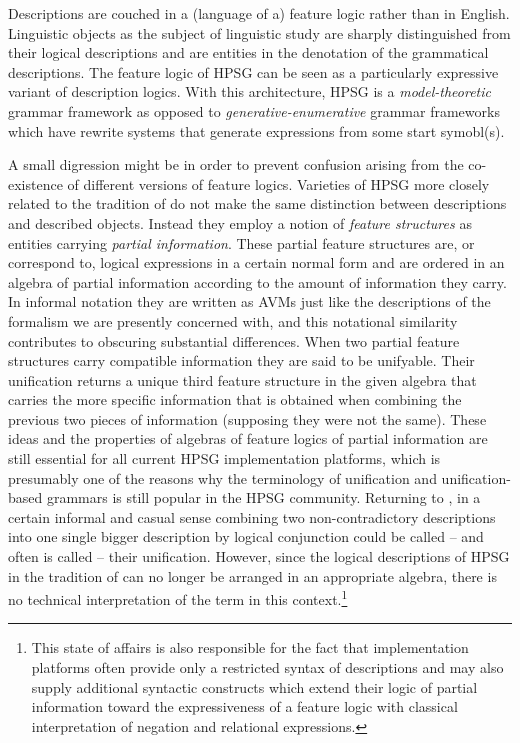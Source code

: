 \documentclass[output=paper
                ,modfonts
                ,nonflat
	        ,collection
	        ,collectionchapter
	        ,collectiontoclongg
 	        ,biblatex
                ,babelshorthands
                ,newtxmath
                ,draftmode
                ,colorlinks, citecolor=brown
]{./langsci/langscibook}
\begin{document}
{Descriptions are couched in a (language of a) feature logic rather
than in English. Linguistic objects as the subject of linguistic study
are sharply distinguished from their logical descriptions and are
entities in the denotation of the grammatical descriptions.  The
feature logic of HPSG can be seen as a particularly expressive variant
of description logics. With this architecture, HPSG is a
\emph{model-theoretic} grammar framework as opposed to
\emph{generative-enumerative} grammar frameworks which
have rewrite systems that generate expressions
from some start symobl(s).

A small digression might be in order to prevent confusion arising from
the co-existence of different versions of feature logics.  Varieties
of HPSG more closely related to the tradition of \cite{PollardSag1987}
do not make the same distinction between descriptions and described
objects. Instead they employ a notion of \emph{feature structures} as
entities carrying \emph{partial information}. These partial feature
structures are, or correspond to, logical expressions in a certain
normal form and are ordered in an algebra of partial information
according to the amount of information they carry. In informal
notation they are written as AVMs just like the descriptions of the
formalism we are presently concerned with, and this notational
similarity contributes to obscuring substantial differences.  When two
partial feature structures carry compatible information they are said
to be unifyable. Their unification returns a unique third feature
structure in the given algebra that carries the more specific
information that is obtained when combining the previous two pieces of
information (supposing they were not the same). These ideas and the
properties of algebras of feature logics of partial information are
still essential for all current HPSG implementation platforms, which
is presumably one of the reasons why the terminology of unification
and unification-based grammars is still popular in the HPSG
community. Returning to \cite{PollardSag1994}, in a certain
informal and casual sense combining two non-contradictory descriptions
into one single bigger description by logical conjunction could be
called -- and often is called -- their unification. However, since the
logical descriptions of HPSG in the tradition of \cite{PollardSag1994}
can no longer be arranged in an appropriate algebra, there is no
technical interpretation of the term in this context.\footnote{This
  state of affairs is also responsible for the fact that
  implementation platforms often provide only a restricted syntax of
  descriptions and may also supply additional syntactic constructs which
  extend their logic of partial information toward the expressiveness of
  a feature logic with classical interpretation of negation and
  relational expressions.}

}
\end{document}
